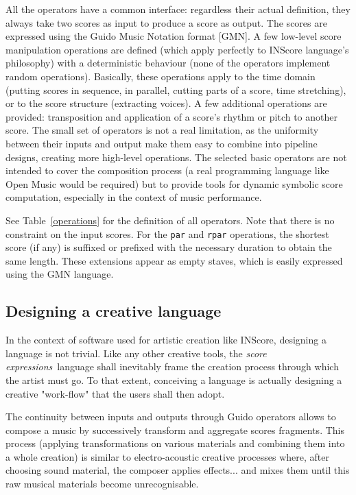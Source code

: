 \documentclass{article}
\newcommand{\OSC}[1]{{\fontsize{10pt}{10pt} \selectfont\texttt{#1}}}
\newcommand{\sExpr}{\emph{score expressions}}
\begin{document}
All the operators have a common interface: regardless their actual definition, they always take two scores as input to produce a score as output. The scores are expressed using the Guido Music Notation format [GMN]\cite{hoos98}. A few low-level score manipulation operations are defined (which apply perfectly to INScore language's philosophy) with a deterministic behaviour (none of the operators implement random operations). Basically, these operations apply to the time domain (putting scores in sequence, in parallel, cutting parts of a score, time stretching), or to the score structure (extracting voices). A few additional operations are provided: transposition and application of a score's rhythm or pitch to another score. 
The small set of operators is not a real limitation, as the uniformity between their inputs and output make them easy to combine into pipeline designs, creating more high-level operations. The selected basic operators are not intended to cover the composition process (a real programming language like Open Music \cite{bresson:hal-01182394} would be required) but to provide tools for dynamic symbolic score computation, especially in the context of music performance.

See Table~\ref{operations} for the definition of all operators. 
Note that there is no constraint on the input scores. For the \OSC{par} and \OSC{rpar} operations, the shortest score (if any) is suffixed or prefixed with the necessary duration to obtain the same length. These extensions appear as empty staves, which is easily expressed using the GMN language.

\subsection{Designing a creative language}
In the context of software used for artistic creation like INScore, designing a language is not trivial. Like any other creative tools,  the \sExpr\ language shall inevitably frame the creation process through which the artist must go. To that extent, conceiving a language is actually designing a creative "work-flow" that the users shall then adopt.

The continuity between inputs and outputs through Guido operators allows to compose a music by successively transform and aggregate scores fragments. This process (applying transformations on various materials and combining them into a whole creation) is similar to electro-acoustic creative processes where, after choosing sound material, the composer applies effects... and mixes them until this raw musical materials become unrecognisable.
\end{document}

